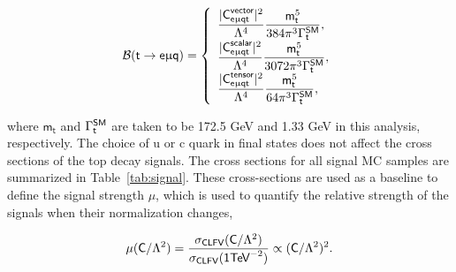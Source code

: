 \begin{equation}
\label{eq:4}
\mathcal{B}(\textsf{t}\rightarrow\textsf{e}\upmu\textsf{q}) = 
\left\{ 
 \begin{array}{l}
 \displaystyle
 \frac{|\textsf{C}^{\textsf{vector}}_{\textsf{e}\upmu\textsf{{q}t}}|^2}{\mathrm{\Lambda}^4}\frac{\textsf{m}_\textsf{t}^5}{384\pi^3\mathrm{\Gamma}_{\textsf{t}}^{\textsf{SM}}},\\
 \displaystyle
 \frac{|\textsf{C}^{\textsf{scalar}}_{\textsf{e}\upmu\textsf{{q}t}}|^2}{\mathrm{\Lambda}^4}\frac{\textsf{m}_\textsf{t}^5}{3072\pi^3\mathrm{\Gamma}_{\textsf{t}}^{\textsf{SM}}}, \\
 \displaystyle
 \frac{|\textsf{C}^{\textsf{tensor}}_{\textsf{e}\upmu\textsf{{q}t}}|^2}{\mathrm{\Lambda}^4}\frac{\textsf{m}_\textsf{t}^5}{64\pi^3\mathrm{\Gamma}_{\textsf{t}}^{\textsf{SM}}}, 
\end{array}
\right.
\end{equation}

where $\textsf{m}_{\textsf{t}}$ and $\mathrm{\Gamma}_{\textsf{t}}^{\textsf{SM}}$ are taken to be 172.5 GeV and 1.33 GeV in this analysis, respectively. The choice of u or c quark in final states does not affect the cross sections of the top decay signals. The cross sections for all signal \ac{MC} samples are summarized in Table~\ref{tab:signal}. These cross-sections are used as a baseline to define the signal strength $\mu$, which is used to quantify the relative strength of the signals when their normalization changes,

\begin{equation}
\mu(\textsf{C}/\mathrm{\Lambda}^2)=\frac{\sigma_{\textsf{CLFV}}(\textsf{C}/\mathrm{\Lambda}^2)}{\sigma_{\textsf{CLFV}}(\textsf{1}\textsf{TeV}^{-2})}\propto(\textsf{C}/\mathrm{\Lambda}^2)^2.
\label{eq:signal_strength}
\end{equation}

